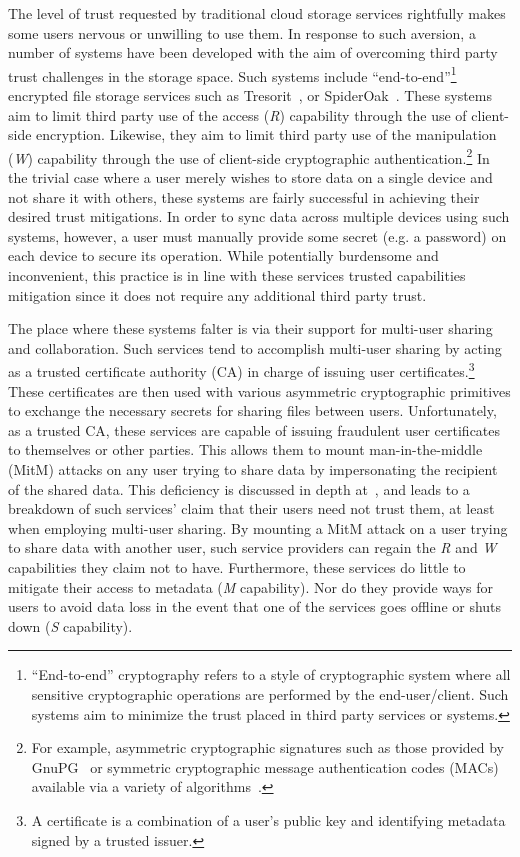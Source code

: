 The level of trust requested by traditional cloud storage services
rightfully makes some users nervous or unwilling to use them. In
response to such aversion, a number of systems have been developed
with the aim of overcoming third party trust challenges in the storage
space. Such systems include ``end-to-end''\footnote{``End-to-end''
  cryptography refers to a style of cryptographic system where all
  sensitive cryptographic operations are performed by the
  end-user/client. Such systems aim to minimize the trust placed in
  third party services or systems.} encrypted file storage services
such as Tresorit~\cite{tresorit}, or SpiderOak~\cite{spideroak}. These
systems aim to limit third party use of the access (\emph{R})
capability through the use of client-side encryption. Likewise, they
aim to limit third party use of the manipulation (\emph{W}) capability
through the use of client-side cryptographic
authentication.\footnote{For example, asymmetric cryptographic
  signatures such as those provided by GnuPG~\cite{gnupg} or symmetric
  cryptographic message authentication codes (MACs) available via a
  variety of algorithms~\cite{dworkin2005, dworkin2008, dworkin2007}.}
In the trivial case where a user merely wishes to store data on a
single device and not share it with others, these systems are fairly
successful in achieving their desired trust mitigations. In order to
sync data across multiple devices using such systems, however, a user
must manually provide some secret (e.g. a password) on each device to
secure its operation. While potentially burdensome and inconvenient,
this practice is in line with these services trusted capabilities
mitigation since it does not require any additional third party trust.

The place where these systems falter is via their support for
multi-user sharing and collaboration. Such services tend to accomplish
multi-user sharing by acting as a trusted certificate authority (CA)
in charge of issuing user certificates.\footnote{A certificate is a
  combination of a user's public key and identifying metadata signed
  by a trusted issuer.}  These certificates are then used with various
asymmetric cryptographic primitives to exchange the necessary secrets
for sharing files between users. Unfortunately, as a trusted CA, these
services are capable of issuing fraudulent user certificates to
themselves or other parties. This allows them to mount
man-in-the-middle (MitM) attacks on any user trying to share data by
impersonating the recipient of the shared data. This deficiency is
discussed in depth at~\cite{wilson2014}, and leads to a breakdown of
such services' claim that their users need not trust them, at least
when employing multi-user sharing. By mounting a MitM attack on a user
trying to share data with another user, such service providers can
regain the \emph{R} and \emph{W} capabilities they claim not to
have. Furthermore, these services do little to mitigate their access
to metadata (\emph{M} capability). Nor do they provide ways for users
to avoid data loss in the event that one of the services goes offline
or shuts down (\emph{S} capability).

